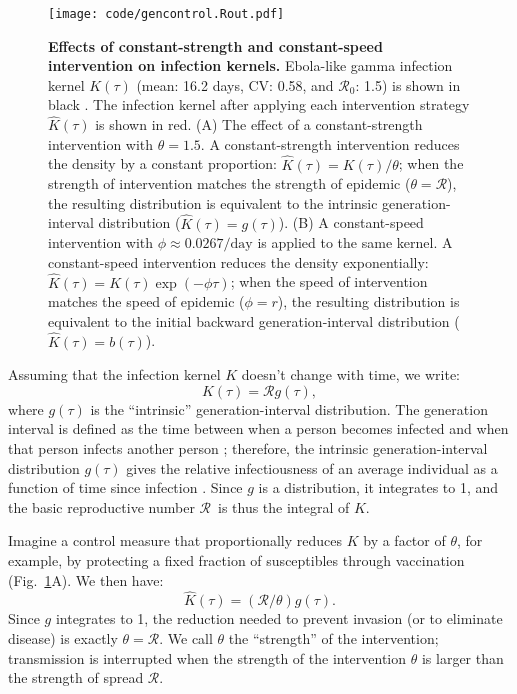 \documentclass[12pt]{article}
\newcommand{\Rx}[1]{\ensuremath{{\mathcal R}_{#1}}}
\newcommand{\Ro}{\Rx{0}}
\newcommand{\RR}{\ensuremath{{\mathcal R}}}
\newcommand{\figref}[1]{Fig.~\ref{fig:#1}}
\newcommand{\figlab}[1]{\label{fig:#1}}
\newcommand{\eqlab}[1]{\label{eq:#1}}
\begin{document}
\begin{figure}[!t]
\texttt{[image: code/gencontrol.Rout.pdf]}
\caption{
\textbf{Effects of constant-strength and constant-speed intervention on infection kernels.}
Ebola-like gamma infection kernel $K(\tau)$ (mean: 16.2 days, CV: 0.58, and \Ro: 1.5) is shown in black \citep{park2019practical}.
The infection kernel after applying each intervention strategy $\hat K(\tau)$ is shown in red.
(A) The effect of a constant-strength intervention with $\theta = 1.5$.
A constant-strength intervention reduces the density by a constant proportion: $\hat K(\tau) = K(\tau)/\theta$; when the strength of intervention matches the strength of epidemic ($\theta = \mathcal R$), the resulting distribution is equivalent to the intrinsic generation-interval distribution ($\hat K(\tau) = g(\tau)$).
(B) A constant-speed intervention with $\phi \approx 0.0267/\mathrm{day}$ is applied to the same kernel.
A constant-speed intervention reduces the density exponentially: $\hat K(\tau) = K(\tau) \exp(-\phi \tau)$; when the speed of intervention matches the speed of epidemic ($\phi = r$), the resulting distribution is equivalent to the initial backward generation-interval distribution ($\hat K(\tau) = b(\tau)$). 
}
\figlab{constant}
\end{figure}

Assuming that the infection kernel $K$ doesn't change with time, we write:
\begin{equation}
	K(\tau) = \RR g(\tau),
	\eqlab{strengthFactors}
\end{equation}
where $g(\tau)$ is the ``intrinsic'' generation-interval distribution.
The generation interval is defined as the time between when a person becomes infected and when that person infects another person \citep{svensson2007note};
therefore, the intrinsic generation-interval distribution $g(\tau)$ gives the relative infectiousness of an average individual as a function of time since infection \citep{champredon2015intrinsic}. 
Since $g$ is a distribution, it integrates to 1, and the basic reproductive number \RR\ is thus the integral of $K$.

Imagine a control measure that proportionally reduces $K$ by a factor of $\theta$, for example, by protecting a fixed fraction of susceptibles through vaccination (\figref{constant}A). We then have:
\begin{equation}
	\hat K(\tau) = (\RR/\theta) g(\tau).
\end{equation}
Since $g$ integrates to 1, the reduction needed to prevent invasion (or to eliminate disease) is exactly $\theta=\RR$. We call $\theta$ the ``strength'' of the intervention; transmission is interrupted when the strength of the intervention $\theta$ is larger than the strength of spread $\RR$.
\end{document}

